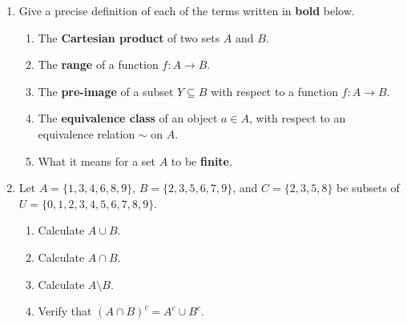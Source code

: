 \documentclass[12pt]{article}
\newcommand{\points}[1]{\marginpar{\hspace{24pt}[#1]}}
\begin{document}
\begin{enumerate}
 \item Give a precise definition of each of the terms written in {\bf bold} below.
\begin{enumerate}
 \item The {\bf Cartesian product} of two sets $A$ and $B$.\points{2}

\vspace{1.5in}

 \item The {\bf range} of a function $f:A\to B$. \points{2}

\vspace{1.5in}

 \item The {\bf pre-image} of a subset $Y\subseteq B$ with respect to a function $f:A\to B$. \points{2}

\vspace{1.5in}

 \item The {\bf equivalence class} of an object $a\in A$, with respect to an equivalence relation $\sim$ on $A$. \points{2}

\vspace{1.5in}

 \item What it means for a set $A$ to be {\bf finite}. \points{2}
\end{enumerate}


\newpage

\item Let $A=\{1,3,4,6,8,9\}$, $B = \{2,3,5,6,7,9\}$, and $C=\{2,3,5,8\}$ be subsets of\\ $U = \{0,1,2,3,4,5,6,7,8,9\}$.
\begin{enumerate}
 \item Calculate $A\cup B$. \points{1}

\vspace{1in}
 
 \item Calculate $A\cap B$. \points{1}

\vspace{1in}

 \item Calculate $A\setminus B$. \points{1}

\vspace{1in}

 \item Verify that $(A\cap B)^c = A^c\cup B^c$. \points{3}


\end{enumerate}
\end{enumerate}
\end{document}
